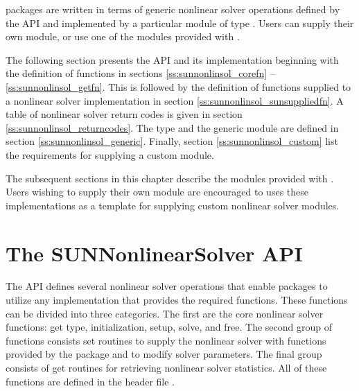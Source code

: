 {\sundials} packages are written in terms of generic nonlinear solver
operations defined by the {\sunnonlinsol} API and implemented by a
particular {\sunnonlinsol} module of type .
Users can supply their own {\sunnonlinsol} module, or use one of the
modules provided with {\sundials}.

The following section presents the {\sunnonlinsol} API and its
implementation beginning with the definition of {\sunnonlinsol}
functions in sections \ref{ss:sunnonlinsol_corefn}
-- \ref{ss:sunnonlinsol_getfn}. This is followed by the definition of
functions supplied to a nonlinear solver implementation in section
\ref{ss:sunnonlinsol_sunsuppliedfn}. A table of nonlinear solver
return codes is given in section \ref{ss:sunnonlinsol_returncodes}.
The  type and the generic {\sunnonlinsol}
module are defined in section \ref{ss:sunnonlinsol_generic}. Finally,
section \ref{ss:sunnonlinsol_custom} list the requirements for
supplying a custom {\sunnonlinsol} module.

The subsequent sections in this chapter describe the {\sunnonlinsol}
modules provided with {\sundials}. Users wishing to supply their own
{\sunnonlinsol} module are encouraged to uses these implementations as
a template for supplying custom nonlinear solver modules. 


\section{The SUNNonlinearSolver API}
\label{s:sunnonlinsol_api}

The {\sunnonlinsol} API defines several nonlinear solver operations
that enable {\sundials} packages to utilize any {\sunnonlinsol}
implementation that provides the required functions. These functions
can be divided into three categories. The first are the core nonlinear
solver functions: get type, initialization, setup, solve, and free.
The second group of functions consists set routines to supply the
nonlinear solver with functions provided by the {\sundials} package
and to modify solver parameters. The final group consists of get
routines for retrieving nonlinear solver statistics. All of these
functions are defined in the header file
.

